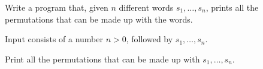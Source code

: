 

\Statement

Write a program that,
given $n$ different words $s_1, \dots, s_n$,
prints all the permutations that can be made up with the words.


\Input

Input consists of a number $n > 0$,
followed by $s_1, \dots, s_n$.


\Output

Print all the permutations that can be made up with $s_1, \dots, s_n$.


\ObservationElastic


\Sample
